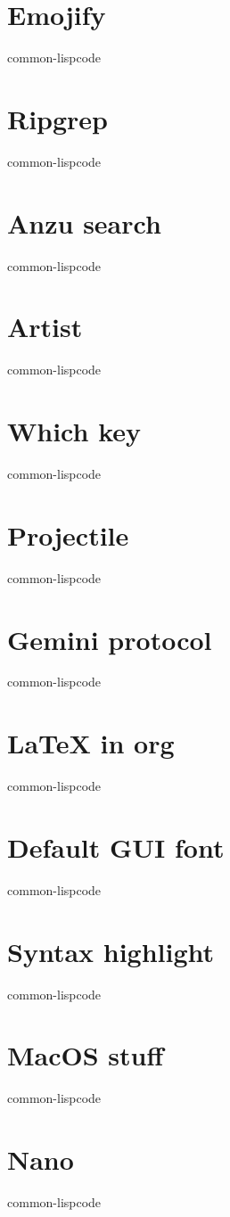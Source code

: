 \documentclass[11pt]{article}
\begin{document}
\section{Emojify}
\label{sec:org89880bf}
common-lispcode
\section{Ripgrep}
\label{sec:orgc88e7e0}
common-lispcode
\section{Anzu search}
\label{sec:orgca74a12}
common-lispcode
\section{Artist}
\label{sec:org4c464e4}
common-lispcode
\section{Which key}
\label{sec:orgfd59c38}
common-lispcode
\section{Projectile}
\label{sec:orgc7f4308}
common-lispcode
\section{Gemini protocol}
\label{sec:org3a5a3af}
common-lispcode
\section{\LaTeX{} in org}
\label{sec:org05033d6}
common-lispcode
\section{Default GUI font}
\label{sec:orgd17471d}
common-lispcode
\section{Syntax highlight}
\label{sec:orge25feef}
common-lispcode
\section{MacOS stuff}
\label{sec:org4fef2d2}
common-lispcode
\section{Nano}
\label{sec:orgba73508}
common-lispcode
\end{document}

